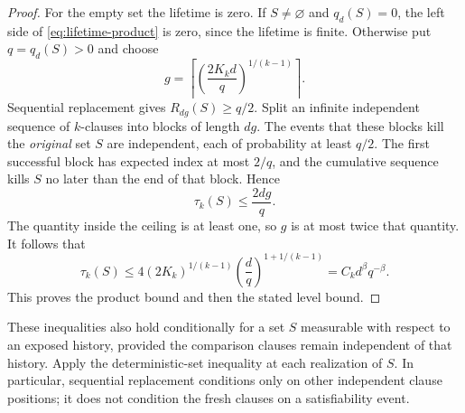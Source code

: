 \begin{proof}
For the empty set the lifetime is zero.  If \(S\ne\varnothing\) and
\(q_d(S)=0\), the left side of \eqref{eq:lifetime-product} is zero,
since the lifetime is finite.  Otherwise put \(q=q_d(S)>0\) and choose
\[
 g=\left\lceil\left(\frac{2K_kd}{q}\right)^{1/(k-1)}\right\rceil.
\]
Sequential replacement gives \(R_{dg}(S)\ge q/2\).  Split an infinite
independent sequence of \(k\)-clauses into blocks of length \(dg\).
The events that these blocks kill the \emph{original} set \(S\) are
independent, each of probability at least \(q/2\).  The first successful
block has expected index at most \(2/q\), and the cumulative sequence
kills \(S\) no later than the end of that block.  Hence
\[
 \tau_k(S)\le\frac{2dg}{q}.
\]
The quantity inside the ceiling is at least one, so \(g\) is at most
twice that quantity.  It follows that
\[
 \tau_k(S)
 \le4(2K_k)^{1/(k-1)}
       \left(\frac dq\right)^{1+1/(k-1)}
 =C_kd^\beta q^{-\beta}.
\]
This proves the product bound and then the stated level bound.
\end{proof}

These inequalities also hold conditionally for a set \(S\) measurable
with respect to an exposed history, provided the comparison clauses
remain independent of that history.  Apply the deterministic-set
inequality at each realization of \(S\).  In particular, sequential
replacement conditions only on other independent clause positions;
it does not condition the fresh clauses on a satisfiability event.

